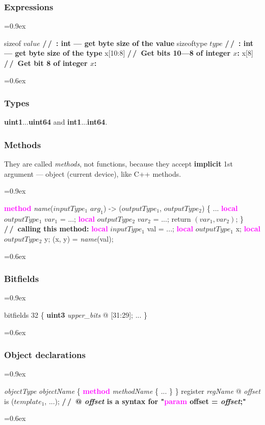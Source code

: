 \documentclass[8pt]{extarticle}
\newcommand{\vshort}[1]{%
\vspace{-0.6em}%
#1%
\vspace{-0.3em}}
\newcommand{\vshort}[1]{%
#1%
}
\newenvironment{code}[1][]{%
\begin{prebox}[#1]\obeylines%
\fontdimen2\font=0.9ex%
}{%
\end{prebox}%
\fontdimen2\font=0.6ex%
}
\newcommand{\ind}{\hphantom{~~~}}
\newcommand{\kw}[1]{\textcolor{magenta}{\textbf{#1}}}
\newcommand{\ty}[1]{\textcolor{myOrange}{\textbf{#1}}}
\newcommand{\cmtcommon}[1]{\textcolor{Sepia}{\textbf{#1}}}
\newcommand{\cmtd}[1]{\cmtcommon{/\,/\ #1}}
\newcommand{\p}[1]{\textit{\large#1}}
\begin{document}
\begin{multicols*}{3}
    \subsubsection{Expressions}
    \begin{code}
        sizeof $value$  \cmtd{: int — get byte size of the value}
        sizeoftype \ty{$type$}  \cmtd{: int — get byte size of the type}
        x[10:8]  \cmtd{Get bits 10—8 of integer $x$:}
        x[8]  \cmtd{Get bit 8 of integer $x$:}
    \end{code}

    \subsubsection{Types}
    \ty{uint1}...\ty{uint64} and \ty{int1}...\ty{int64}.

    \subsubsection{Methods}
    They are called \textit{methods}, not functions, because
    they accept \textbf{implicit} 1st argument — object (current
    device), like C++ methods.
    \begin{code}
        \kw{method} \p{name}(\ty{$inputType_1$} $arg_1$) -> (\ty{$outputType_1$}, \ty{$outputType_2$}) \{
            \vshort{\ind ...}
            \ind \kw{local} \ty{$outputType_1$} $var_1$ = ...; \kw{local} \ty{$outputType_2$} $var_2$ = ...;
            \ind return $(var_1, var_2)$;
        \}
        \cmtd{calling this method:}
        \kw{local} \ty{$inputType_1$} val = ...;
        \kw{local} \ty{$outputType_1$} x; \kw{local} \ty{$outputType_2$} y;
        (x, y) = \p{name}(val);
    \end{code}

    \subsubsection{Bitfields}
    \begin{code}
        bitfields 32 \{
            \ind \ty{uint3} \p{upper_bits} @ [31:29];
            \vshort{\ind ...}
        \}
    \end{code}

    \subsubsection{Object declarations}
    \begin{code}
        \p{objectType} \p{objectName} \{
            \ind \kw{method} \p{methodName} \{
            \ind     \vshort{\ind \ind ...}
            \ind \}
        \}
        register \p{regName} @ \p{offset} is ($template_1$, ...);
        \cmtd{@ \p{offset} is a syntax for "\kw{param} offset = \p{offset};"}
    \end{code}


\end{multicols*}
\end{document}
